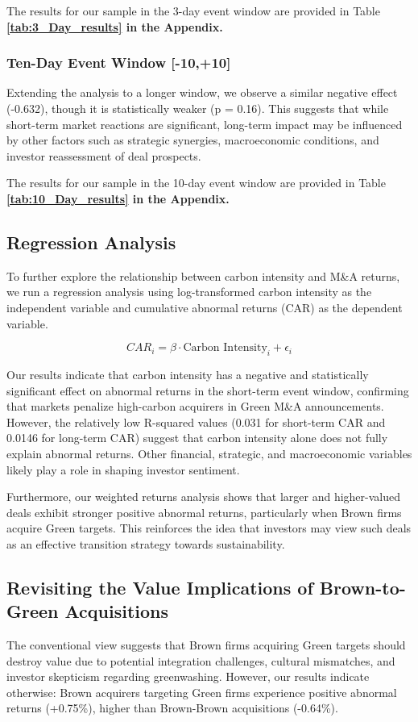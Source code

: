 \documentclass[a4paper]{article}
\begin{document}
The results for our sample in the 3-day event window are provided in Table \textbf{\ref{tab:3_Day_results} in the Appendix.} 

\subsubsection{Ten-Day Event Window [-10,+10]}
Extending the analysis to a longer window, we observe a similar negative effect (-0.632), though it is statistically weaker (p = 0.16). This suggests that while short-term market reactions are significant, long-term impact may be influenced by other factors such as strategic synergies, macroeconomic conditions, and investor reassessment of deal prospects.

The results for our sample in the 10-day event window are provided in Table \textbf{\ref{tab:10_Day_results} in the Appendix.} 

\subsection{Regression Analysis}
To further explore the relationship between carbon intensity and M\&A returns, we run a regression analysis using log-transformed carbon intensity as the independent variable and cumulative abnormal returns (CAR) as the dependent variable.

\begin{equation}
\label{eq:car_regression}
    CAR_{i} = \beta \cdot \text{Carbon Intensity}_{i} + \epsilon_{i}
\end{equation}

Our results indicate that carbon intensity has a negative and statistically significant effect on abnormal returns in the short-term event window, confirming that markets penalize high-carbon acquirers in Green M\&A announcements. However, the relatively low R-squared values (0.031 for short-term CAR and 0.0146 for long-term CAR) suggest that carbon intensity alone does not fully explain abnormal returns. Other financial, strategic, and macroeconomic variables likely play a role in shaping investor sentiment.

Furthermore, our weighted returns analysis shows that larger and higher-valued deals exhibit stronger positive abnormal returns, particularly when Brown firms acquire Green targets. This reinforces the idea that investors may view such deals as an effective transition strategy towards sustainability.

\subsection{Revisiting the Value Implications of Brown-to-Green Acquisitions}
The conventional view suggests that Brown firms acquiring Green targets should destroy value due to potential integration challenges, cultural mismatches, and investor skepticism regarding greenwashing. However, our results indicate otherwise: Brown acquirers targeting Green firms experience positive abnormal returns (+0.75\%), higher than Brown-Brown acquisitions (-0.64\%).
\end{document}

